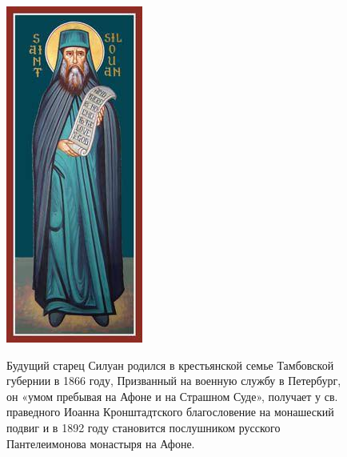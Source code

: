 \documentclass[12pt,a4paper]{article}
\begin{document}
\begin{figure}[h]
\begin{minipage}[b]{\firstcolumnwidth}
\includegraphics[width=\linewidth]{img/521.jpg}
\end{minipage}
\hspace{0.01\linewidth}
\begin{minipage}[b]{\secondcolumnwidth}
Будущий старец Силуан родился в крестьянской семье Тамбовской губернии в 1866 году, Призванный на военную службу в Петербург, он «умом пребывая на Афоне и на Страшном Суде», получает у св. праведного Иоанна Кронштадтского благословение на монашеский подвиг и в 1892 году становится послушником русского Пантелеимонова монастыря на Афоне. 


\end{minipage}
\end{figure}
\end{document}
